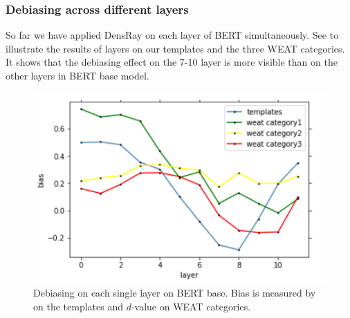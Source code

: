 \subsubsection{Debiasing across different layers}
So far we have applied DensRay on each layer of BERT simultaneously.
 See  to illustrate the results of layers on our templates and the three WEAT categories. It shows that the debiasing effect on the 7-10 layer is more visible than on the other layers in BERT base model.
\begin{figure}[ht]
	\centering
	\includegraphics[width=0.9\linewidth]{layers_base}
	\caption{Debiasing on each single layer on BERT base. Bias is measured by  on the templates and $d$-value on WEAT categories.}
\end{figure}

